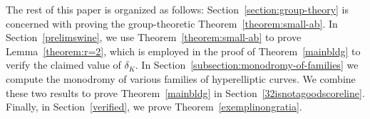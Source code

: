 The rest of this paper is organized as follows:
Section~\ref{section:group-theory} is concerned with proving the
group-theoretic Theorem~\ref{theorem:small-ab}.
In Section~\ref{prelimswine},
we use Theorem~\ref{theorem:small-ab} to prove
Lemma~\ref{theorem:r=2}, which
is employed in the proof of 
Theorem~\ref{mainbldg} to verify the claimed value
of $\delta_K$.
In Section~\ref{subsection:monodromy-of-families}
we compute the monodromy of various families of hyperelliptic curves.
We combine these two results to prove Theorem~\ref{mainbldg}
in Section~\ref{32isnotagoodscoreline}.
Finally, in Section~\ref{verified},
we prove Theorem~\ref{exemplinongratia}.
